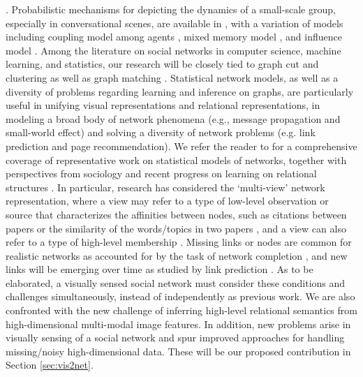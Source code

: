. Probabilistic mechanisms for depicting the dynamics of a small-scale group, especially in conversational scenes, are available in \cite{Basu:meeting,Dong}, with a variation of models including coupling model among agents \cite{Brand:CHMM}, mixed memory model \cite{Choudhury:MHMM}, and influence model \cite{Pan:influence}. Among the literature on social networks in computer science, machine learning, and statistics, our research will be closely tied to graph cut and clustering \cite{Ng:spectral,Boykov:segmentation,Filippone:clustering,Xu:clustering} as well as graph matching \cite{West:Graph,Caetano:graph}. Statistical network models, as well as a diversity of problems regarding learning and inference on graphs, are particularly useful in unifying visual representations and relational representations, in modeling a broad body of network phenomena (e.g., message propagation and small-world effect) and solving a diversity of network problems (e.g. link prediction and page recommendation). We refer the reader to \cite{Goldenberg,Kolacyzk} for a comprehensive coverage of representative work on statistical models of networks, together with perspectives from sociology \cite{Snijders} and recent progress on learning on relational structures \cite{Rossi}. In particular, research has considered the `multi-view' network representation, where a view may refer to a type of low-level observation or source that characterizes the affinities between nodes, such as citations between papers or the similarity of the words/topics in two papers \cite{ChangB09,WangMM05}, and a view can also refer to a type of high-level membership \cite{AiroldiBFX08,Kim12}. Missing links or nodes are common for realistic networks as accounted for by the task of network completion \cite{Clauset,Guimera,HannekeX09,KimL11}, and new links will be emerging over time as studied by link prediction \cite{Goldberg,Liben-Nowell,TaskarWAK03}. As to be elaborated, a visually sensed social network must consider these conditions and challenges simultaneously, instead of independently as previous work. We are also confronted with the new challenge of inferring high-level relational semantics from high-dimensional multi-modal image features. In addition, new problems arise in visually sensing of a social network and spur improved approaches for handling missing/noisy high-dimensional data. These will be our proposed contribution in Section \ref{sec:vis2net}.




